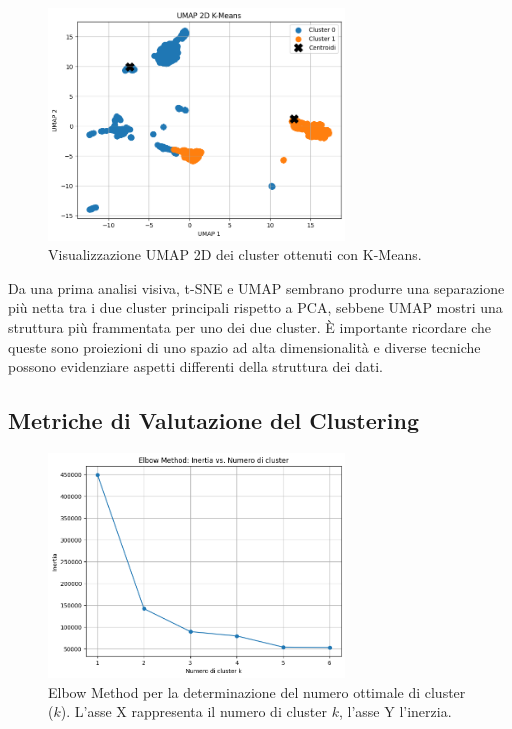 \documentclass[11pt, a4paper]{article}
\begin{document}
\begin{figure}[H]
    \centering
    \includegraphics[width=0.7\textwidth]{images/clustering_umap.png}
    \caption{Visualizzazione UMAP 2D dei cluster ottenuti con K-Means.}
    \label{fig:umap}
\end{figure}

Da una prima analisi visiva, t-SNE e UMAP sembrano produrre una separazione più netta tra i due cluster principali rispetto a PCA, sebbene UMAP mostri una struttura più frammentata per uno dei due cluster. È importante ricordare che queste sono proiezioni di uno spazio ad alta dimensionalità e diverse tecniche possono evidenziare aspetti differenti della struttura dei dati.

\subsection{Metriche di Valutazione del Clustering}

\begin{figure}[H]
    \centering
    \includegraphics[width=0.7\textwidth]{images/elbow_method.png}
    \caption{Elbow Method per la determinazione del numero ottimale di cluster ($k$). L'asse X rappresenta il numero di cluster $k$, l'asse Y l'inerzia.}
    \label{fig:elbow}
\end{figure}
\end{document}
